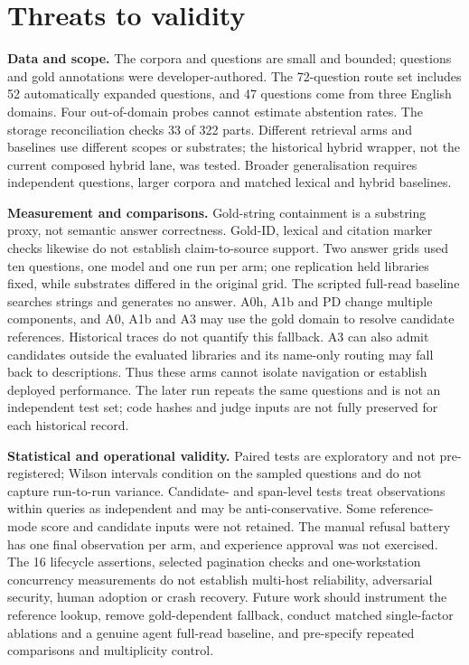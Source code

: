 \section{Threats to validity}
\label{sec:threats}

\noindent\textbf{Data and scope.} The corpora and questions are small and
bounded; questions and gold annotations were developer-authored. The
72-question route set includes 52 automatically expanded questions, and 47
questions come from three English domains. Four out-of-domain probes cannot
estimate abstention rates. The storage reconciliation checks 33 of 322 parts.
Different retrieval arms and baselines use different scopes or substrates;
the historical hybrid wrapper, not the current composed hybrid lane, was
tested. Broader generalisation requires independent questions, larger corpora
and matched lexical and hybrid baselines.

\noindent\textbf{Measurement and comparisons.} Gold-string containment is a
substring proxy, not semantic answer correctness. Gold-ID, lexical and citation
marker checks likewise do not establish claim-to-source support. Two answer
grids used ten questions, one model and one run per arm; one replication held
libraries fixed, while substrates differed in the original grid. The scripted
full-read baseline searches strings and generates no answer. A0h, A1b and PD
change multiple components, and A0, A1b and A3 may use the gold domain to
resolve candidate references. Historical traces do not quantify this fallback.
A3 can also admit candidates outside the evaluated libraries and its
name-only routing may fall back to descriptions. Thus these arms cannot isolate
navigation or establish deployed performance. The later run repeats the same
questions and is not an independent test set; code hashes and judge inputs are
not fully preserved for each historical record.

\noindent\textbf{Statistical and operational validity.} Paired tests are
exploratory and not pre-registered; Wilson intervals condition on the sampled
questions and do not capture run-to-run variance. Candidate- and span-level
tests treat observations within queries as independent and may be
anti-conservative. Some reference-mode score and candidate inputs were not
retained. The manual refusal battery has one final observation per arm, and
experience approval was not exercised. The 16 lifecycle assertions, selected
pagination checks and one-workstation concurrency measurements do not establish
multi-host reliability, adversarial security, human adoption or crash recovery.
Future work should instrument the reference lookup, remove gold-dependent
fallback, conduct matched single-factor ablations and a genuine agent full-read
baseline, and pre-specify repeated comparisons and multiplicity control.
